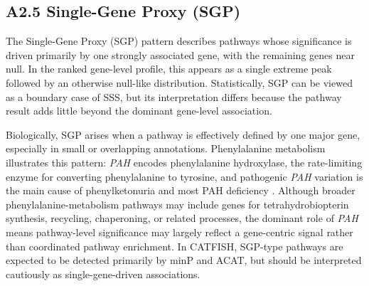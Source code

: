 \documentclass[unnumsec,webpdf,contemporary,large]{oup-authoring-template}%
\theoremstyle{thmstyleone}%
\theoremstyle{thmstyletwo}%
\theoremstyle{thmstylethree}%
\begin{document}
\begin{appendices}
\subsection{A2.5 Single-Gene Proxy (SGP)}

The Single-Gene Proxy (SGP) pattern describes pathways whose significance is driven primarily by one strongly associated gene, with the remaining genes near null. In the ranked gene-level profile, this appears as a single extreme peak followed by an otherwise null-like distribution. Statistically, SGP can be viewed as a boundary case of SSS, but its interpretation differs because the pathway result adds little beyond the dominant gene-level association.

Biologically, SGP arises when a pathway is effectively defined by one major gene, especially in small or overlapping annotations. Phenylalanine metabolism illustrates this pattern: \textit{PAH} encodes phenylalanine hydroxylase, the rate-limiting enzyme for converting phenylalanine to tyrosine, and pathogenic \textit{PAH} variation is the main cause of phenylketonuria and most PAH deficiency \citep{Flydal2013PAH, Elhawary2022PKU}. Although broader phenylalanine-metabolism pathways may include genes for tetrahydrobiopterin synthesis, recycling, chaperoning, or related processes, the dominant role of \textit{PAH} means pathway-level significance may largely reflect a gene-centric signal rather than coordinated pathway enrichment. In CATFISH, SGP-type pathways are expected to be detected primarily by minP and ACAT, but should be interpreted cautiously as single-gene-driven associations.







\end{appendices}
\end{document}
